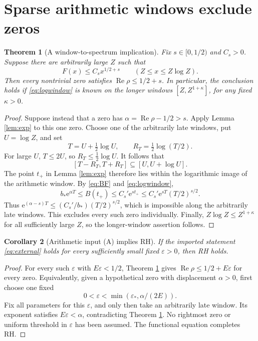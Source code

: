 \documentclass[11pt,a4paper]{article}
\newtheorem{theorem}{Theorem}[section]
\newtheorem{corollary}[theorem]{Corollary}
\theoremstyle{remark}\newtheorem{remark}[theorem]{Remark}
\newcommand{\e}{\mathrm e}
\newcommand{\Rea}{\operatorname{Re}}
\begin{document}
\section{Sparse arithmetic windows exclude zeros}
\begin{theorem}[A window-to-spectrum implication]\label{thm:window}
Fix \(s\in[0,1/2)\) and \(C_s>0\). Suppose there are
arbitrarily large \(Z\) such that
\begin{equation}
 F(x)\le C_s x^{1/2+s}\qquad(Z\le x\le Z\log Z).
 \label{eq:logwindow}
\end{equation}
Then every nontrivial zero satisfies \(\Rea\rho\le1/2+s\).
In particular, the conclusion holds if \eqref{eq:logwindow}
is known on the longer windows \([Z,Z^{1+\kappa}]\), for any
fixed \(\kappa>0\).
\end{theorem}
\begin{proof}
Suppose instead that a zero has
\(\alpha=\Rea\rho-1/2>s\). Apply Lemma \ref{lem:exp} to
this one zero. Choose one of the arbitrarily late windows, put
\(U=\log Z\), and set
\[
 T=U+\tfrac12\log U,\qquad R_T=\tfrac12\log(T/2).
\]
For large \(U\), \(T\le2U\), so \(R_T\le\tfrac12\log U\).
It follows that
\[
 [T-R_T,T+R_T]\subseteq[U,U+\log U].
\]
The point \(t_+\) in Lemma \ref{lem:exp} therefore lies within
the logarithmic image of the arithmetic window. By
\eqref{eq:BF} and \eqref{eq:logwindow},
\[
 b_*\e^{\alpha T}\le B(t_+)
       \le C_s'\e^{s t_+}
       \le C_s'\e^{sT}(T/2)^{s/2}.
\]
Thus
\(\e^{(\alpha-s)T}\le(C_s'/b_*)(T/2)^{s/2}\), which is
impossible along the arbitrarily late windows. This excludes
every such zero individually. Finally,
\(Z\log Z\le Z^{1+\kappa}\) for all sufficiently large \(Z\),
so the longer-window assertion follows.
\end{proof}

\begin{corollary}[Arithmetic input (A) implies RH]\label{cor:RH}
If the imported statement \eqref{eq:external} holds for every
sufficiently small fixed \(\varepsilon>0\), then RH holds.
\end{corollary}
\begin{proof}
For every such \(\varepsilon\) with \(E\varepsilon<1/2\),
Theorem \ref{thm:window} gives
\(\Rea\rho\le1/2+E\varepsilon\) for every zero. Equivalently,
given a hypothetical zero with displacement \(\alpha>0\),
first choose one fixed
\[
 0<\varepsilon<\min(\varepsilon_*,\alpha/(2E)).
\]
Fix all parameters for this \(\varepsilon\), and only then take
an arbitrarily late window. Its exponent satisfies
\(E\varepsilon<\alpha\), contradicting Theorem \ref{thm:window}.
No rightmost zero or uniform threshold in \(\varepsilon\) has
been assumed. The functional equation completes RH.
\end{proof}
\end{document}
